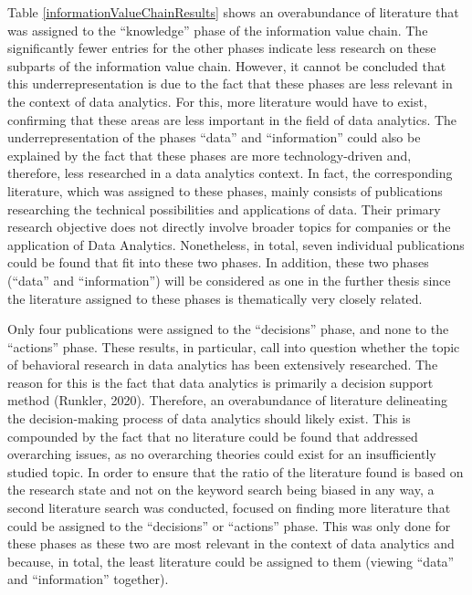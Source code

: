 Table \ref{informationValueChainResults} shows an overabundance of literature that was assigned to the \enquote{knowledge} phase of the information value chain. The significantly fewer entries for the other phases indicate less research on these subparts of the information value chain. However, it cannot be concluded that this underrepresentation is due to the fact that these phases are less relevant in the context of data analytics. For this, more literature would have to exist, confirming that these areas are less important in the field of data analytics. The underrepresentation of the phases \enquote{data} and \enquote{information} could also be explained by the fact that these phases are more technology-driven and, therefore, less researched in a data analytics context. In fact, the corresponding literature, which was assigned to these phases, mainly consists of publications researching the technical possibilities and applications of data. Their primary research objective does not directly involve broader topics for companies or the application of Data Analytics. Nonetheless, in total, seven individual publications could be found that fit into these two phases. In addition, these two phases (\enquote{data} and \enquote{information}) will be considered as one in the further thesis since the literature assigned to these phases is thematically very closely related.

Only four publications were assigned to the \enquote{decisions} phase, and none to the \enquote{actions} phase. These results, in particular, call into question whether the topic of behavioral research in data analytics has been extensively researched. The reason for this is the fact that data analytics is primarily a decision support method (Runkler, 2020). Therefore, an overabundance of literature delineating the decision-making process of data analytics should likely exist. This is compounded by the fact that no literature could be found that addressed overarching issues, as no overarching theories could exist for an insufficiently studied topic. In order to ensure that the ratio of the literature found is based on the research state and not on the keyword search being biased in any way, a second literature search was conducted, focused on finding more literature that could be assigned to the \enquote{decisions} or \enquote{actions} phase. This was only done for these phases as these two are most relevant in the context of data analytics and because, in total, the least literature could be assigned to them (viewing \enquote{data} and \enquote{information} together).

